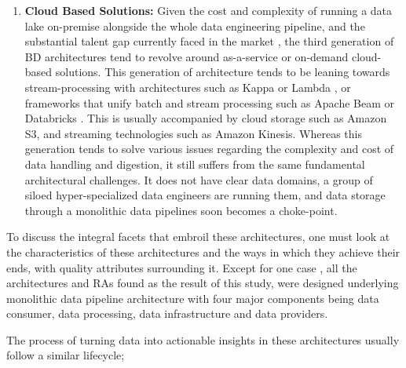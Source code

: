 \documentclass[review]{elsarticle}
\begin{document}
\begin{enumerate}
    \item \textbf{Cloud Based Solutions:} Given the cost and complexity of running a data lake on-premise alongside the whole data engineering pipeline, and the substantial talent gap currently faced in the market \cite{AtaeiHype}, the third generation of BD architectures tend to revolve around as-a-service or on-demand cloud-based solutions. This generation of architecture tends to be leaning towards stream-processing with architectures such as Kappa or Lambda \cite{lin2017lambda}, or frameworks that unify batch and stream processing such as Apache Beam \cite{ApachBeam} or Databricks \cite{DataBricks}. This is usually accompanied by cloud storage such as Amazon S3, and streaming technologies such as Amazon Kinesis. Whereas this generation tends to solve various issues regarding the complexity and cost of data handling and digestion, it still suffers from the same fundamental architectural challenges. It does not have clear data domains, a group of siloed hyper-specialized data engineers are running them, and data storage through a monolithic data pipelines soon becomes a choke-point.
\end{enumerate}

To discuss the integral facets that embroil these architectures, one must look at the characteristics of these architectures and the ways in which they achieve their ends, with quality attributes surrounding it. Except for one case \cite{AtaeiApsec}, all the architectures and RAs found as the result of this study, were designed underlying monolithic data pipeline architecture with four major components being data consumer, data processing, data infrastructure and data providers.

The process of turning data into actionable insights in these architectures usually follow a similar lifecycle;
\end{document}
